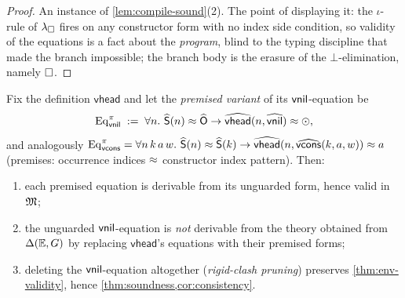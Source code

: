 \begin{proof}
An instance of \cref{lem:compile-sound}(2).  The point of displaying it:
the $\iota$-rule of $\lambda_{\square}$ fires on any constructor form with no index
side condition, so validity of the equations is a fact about the
\emph{program}, blind to the typing discipline that made the branch
impossible; the branch body is the erasure of the $\bot$-elimination,
namely $\square$.
\end{proof}

\begin{proposition}
\label{prop:premised-weaker}
Fix the definition $\mathsf{vhead}$ and let the \emph{premised variant}
of its $\mathsf{vnil}$-equation be
\[
  \mathrm{Eq}^{\pi}_{\mathsf{vnil}} \;\mathrel{:=}\;
  \forall n.\ \widehat{\mathsf{S}}(n) \approx \widehat{\mathsf{O}} \to
  \widehat{\mathsf{vhead}}(n, \widehat{\mathsf{vnil}}) \approx \odot,
\]
and analogously $\mathrm{Eq}^{\pi}_{\mathsf{vcons}} = \forall n\,k\,a\,w.\
\widehat{\mathsf{S}}(n) \approx \widehat{\mathsf{S}}(k) \to \widehat{\mathsf{vhead}}(n,
\widehat{\mathsf{vcons}}(k,a,w)) \approx a$ (premises: occurrence indices $\approx$
constructor index pattern).  Then:
\begin{enumerate}[leftmargin=2em]
\item each premised equation is derivable from its unguarded form, hence
  valid in $\mathfrak{M}$;
\item the unguarded $\mathsf{vnil}$-equation is \emph{not} derivable from the
  theory obtained from $\Delta(\mathbb{E},G)$ by replacing $\mathsf{vhead}$'s equations
  with their premised forms;
\item deleting the $\mathsf{vnil}$-equation altogether (\emph{rigid-clash
  pruning}) preserves \cref{thm:env-validity}, hence
  \cref{thm:soundness,cor:consistency}.
\end{enumerate}
\end{proposition}

